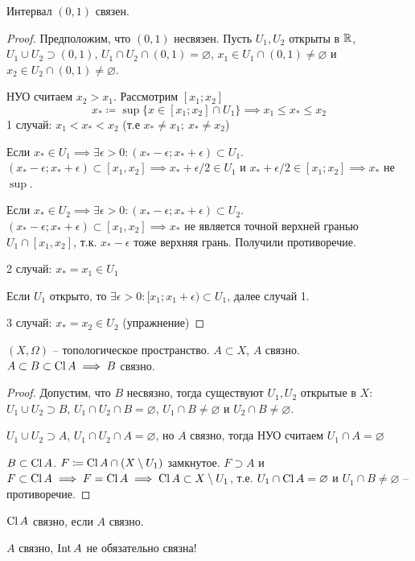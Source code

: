 \documentclass[main]{subfiles}
\begin{document}
\begin{theorem}
    Интервал $(0,1)$ связен.
\end{theorem}
\begin{proof}
    Предположим, что $(0,1)$ несвязен.
    Пусть $U_1, U_2$ открыты в $\mathbb{R}$, $U_1 \cup U_2 \supset (0,1)$, $U_1 \cap U_2 \cap (0,1) = \varnothing$,
    $x_1 \in U_1 \cap (0,1) \neq \varnothing$ и $x_2\in U_2 \cap (0,1) \neq \varnothing$.

    НУО считаем $x_2 > x_1$. Рассмотрим $[x_1; x_2]$
    \[x_* \coloneqq \sup \{x \in [x_1; x_2] \cap U_1\} \implies x_1 \le x_* \le x_2\]
    1 случай: $x_1 < x_* < x_2$ (т.е $x_* \neq x_1;\ x_* \neq x_2$)

    Если $x_* \in U_1 \implies \exists \epsilon >0 : (x_*-\epsilon; x_* + \epsilon) \subset U_1$.
    $(x_*-\epsilon; x_* + \epsilon) \subset [x_1, x_2] \implies x_* + \epsilon / 2 \in U_1$ и
    $x_* + \epsilon/2 \in [x_1; x_2] \implies x_*$ не $\sup$.

    Если $x_* \in U_2 \implies \exists \epsilon >0 : (x_*-\epsilon; x_* + \epsilon) \subset U_2$.
    $(x_*-\epsilon; x_* + \epsilon) \subset [x_1, x_2] \implies x_*$ не является точной верхней гранью
    $U_1 \cap [x_1, x_2]$, т.к. $x_* - \epsilon$ тоже верхняя грань. Получили противоречие.

    2 случай: $x_* = x_1 \in U_1$

    Если $U_1$ открыто, то $\exists \epsilon > 0 : [x_1; x_1 + \epsilon) \subset U_1$, далее случай 1.

    3 случай: $x_* = x_2 \in U_2$ (упражнение)
\end{proof}

\begin{theorem}
    $(X, \Omega)$ -- топологическое пространство. $A \subset X$, $A$ связно.
    $A \subset B \subset \operatorname{Cl} A \implies B$ связно.
\end{theorem}
\begin{proof}
    Допустим, что  $B$ несвязно, тогда существуют $U_1, U_2$ открытые в $X$:
    $U_1 \cup U_2 \supset B$, $U_1 \cap U_2 \cap B = \varnothing$,
    $U_1 \cap B \neq \varnothing$ и $U_2 \cap B \neq \varnothing$.

    $U_1 \cup U_2 \supset A$, $U_1 \cap U_2 \cap A = \varnothing$,
    но $A$ связно, тогда НУО считаем $U_1 \cap A = \varnothing$

    $B \subset \operatorname{Cl} A$. $F \coloneqq \operatorname{Cl} A \cap (X \setminus U_1)$ замкнутое.
    $F \supset A$ и $F \subset \operatorname{Cl} A \implies F = \operatorname{Cl} A \implies \operatorname{Cl} A \subset X \setminus U_1$,
    т.е. $U_1 \cap \operatorname{Cl} A = \varnothing$ и $U_1 \cap B \neq \varnothing$ -- противоречие.
\end{proof}
\begin{corollary}
    $\operatorname{Cl} A$ связно, если $A$ связно.
\end{corollary}
\begin{remark}
    $A$ связно, $\operatorname{Int} A$ не обязательно связна!
\end{remark}
\end{document}
